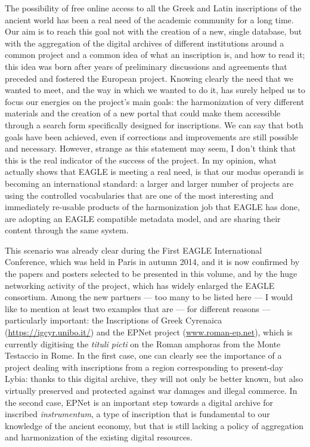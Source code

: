 The possibility of free online access to all the Greek and Latin inscriptions of the ancient world has been a real need of the academic community for a long time. Our aim is to reach this goal not with the creation of a new, single database, but with the aggregation of the digital archives of different institutions around a common project and a common idea of what an inscription is, and how to read it; this idea was born after years of preliminary discussions and agreements that preceded and fostered the European project. Knowing clearly the need that we wanted to meet, and the way in which we wanted to do it, has surely helped us to focus our energies on the project’s main goals: the harmonization of very different materials and the creation of a new portal that could make them accessible through a search form specifically designed for inscriptions. We can say that both goals have been achieved, even if corrections and improvements are still possible and necessary. However, strange as this statement may seem, I don’t think that this is the real indicator of the success of the project. In my opinion, what actually shows that EAGLE is meeting a real need, is that our modus operandi is becoming an international standard: a larger and larger number of projects are using the controlled vocabularies that are one of the most interesting and immediately re-usable products of the harmonization job that EAGLE has done, are adopting an EAGLE compatible metadata model, and are sharing their content through the same system.


This scenario was already clear during the First EAGLE International Conference, which was held in Paris in autumn 2014, and it is now confirmed by the papers and posters selected to be presented in this volume, and by the huge networking activity of the project, which has widely enlarged the EAGLE consortium. Among the new partners --- too many to be listed here --- I would like to mention at least two examples that are --- for different reasons --- particularly important: the Inscriptions of Greek Cyrenaica (\url{https://igcyr.unibo.it/}) and the EPNet project (\url{www.roman-ep.net}), which is currently digitising the \emph{tituli picti} on the Roman amphoras from the Monte Testaccio in Rome. In the first case, one can clearly see the importance of a project dealing with inscriptions from a region corresponding to present-day Lybia: thanks to this digital archive, they will not only be better known, but also virtually preserved and protected against war damages and illegal commerce. In the second case, EPNet is an important step towards a digital archive for inscribed \emph{instrumentum}, a type of inscription that is fundamental to our knowledge of the ancient economy, but that is still lacking a policy of aggregation and harmonization of the existing digital resources.


